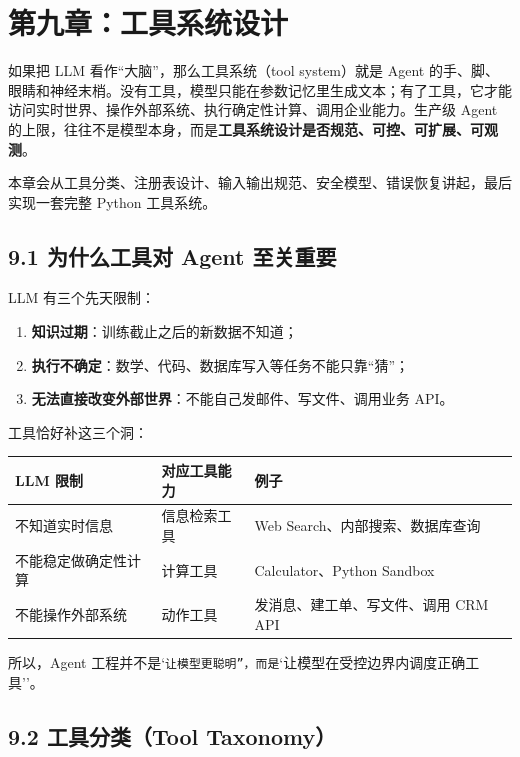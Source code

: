 \chapter{第九章：工具系统设计}

如果把 LLM 看作``大脑''，那么工具系统（tool system）就是 Agent 的手、脚、眼睛和神经末梢。没有工具，模型只能在参数记忆里生成文本；有了工具，它才能访问实时世界、操作外部系统、执行确定性计算、调用企业能力。生产级 Agent 的上限，往往不是模型本身，而是\textbf{工具系统设计是否规范、可控、可扩展、可观测}。


本章会从工具分类、注册表设计、输入输出规范、安全模型、错误恢复讲起，最后实现一套完整 Python 工具系统。


\section{9.1 为什么工具对 Agent 至关重要}

LLM 有三个先天限制：


\begin{enumerate}[leftmargin=2em]
\item \textbf{知识过期}：训练截止之后的新数据不知道；
\item \textbf{执行不确定}：数学、代码、数据库写入等任务不能只靠``猜''；
\item \textbf{无法直接改变外部世界}：不能自己发邮件、写文件、调用业务 API。
\end{enumerate}

工具恰好补这三个洞：


\begingroup
\scriptsize
\setlength{\tabcolsep}{3pt}
\begin{longtable}{|p{}|p{}|p{}|}
\hline
LLM 限制 & 对应工具能力 & 例子 \\ \hline
不知道实时信息 & 信息检索工具 & Web Search、内部搜索、数据库查询 \\ \hline
不能稳定做确定性计算 & 计算工具 & Calculator、Python Sandbox \\ \hline
不能操作外部系统 & 动作工具 & 发消息、建工单、写文件、调用 CRM API \\ \hline
\end{longtable}
\endgroup

所以，Agent 工程并不是`\texttt{让模型更聪明''，而是}`让模型在受控边界内调度正确工具''。


\section{9.2 工具分类（Tool Taxonomy）}

